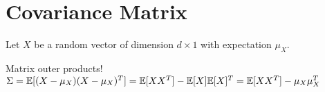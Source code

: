 \section{Covariance Matrix}
Let $X$  be a random vector of dimension $d \times 1$ with expectation $\mu _{X}$. 

Matrix outer products!\\ 

$\Sigma =\mathbb E[(X- \mu _{X})(X- \mu _{X})^ T] \\= \mathbb {E}[XX^ T] - \mathbb {E}[X]\mathbb {E}[X]^ T
\\= \mathbb {E}[XX^ T] - \mu _{X}\mu _{X}^ T$


